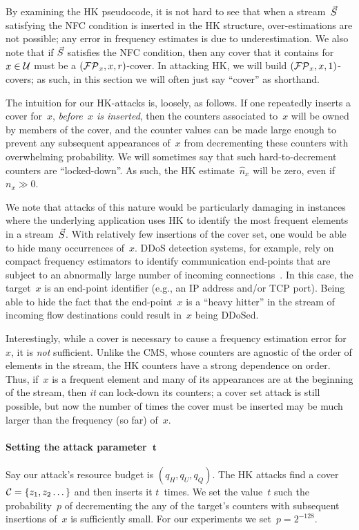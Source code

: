 By examining the HK pseudocode, it is not hard to see that when a stream~$\vec{S}$ satisfying the NFC condition is inserted in the HK structure, over-estimations are not possible; any error in frequency estimates is due to underestimation. 
%
We also note that if $\vec{S}$ satisfies the NFC condition, then any cover that it contains for $x \in \mathcal{U}$ must be a $(\mathcal{FP}_x,x,r)$-cover. In attacking HK, we will build $(\mathcal{FP}_x,x,1)$-covers; as such, in this section we will often just say ``cover'' as shorthand.  

The intuition for our HK-attacks is, loosely, as follows.  If one repeatedly inserts a cover for~$x$, \emph{before~$x$ is inserted}, then the counters associated to~$x$ will be owned by members of the cover, and the counter values can be made large enough to prevent any subsequent appearances of~$x$ from decrementing these counters with overwhelming probability.  We will sometimes say that such hard-to-decrement counters are ``locked-down''. As such, the HK estimate~$\hat{n}_x$ will be zero, even if $n_x \gg 0$. 

We note that attacks of this nature would be particularly damaging in instances where the underlying application uses HK to identify the most frequent elements in a stream~$\vec{S}$. With relatively few insertions of the cover set, one would be able to hide many occurrences of~$x$.  DDoS detection systems, for example, rely on compact frequency estimators to identify communication end-points that are subject to an abnormally large number of incoming connections~\cite{Liu_Sun_Kim_2011}. In this case, the target~$x$ is an end-point identifier (e.g., an IP address and/or TCP port). Being able to hide the fact that the end-point~$x$ is a ``heavy hitter'' in the stream of incoming flow destinations could result in~$x$ being DDoSed. 

Interestingly, while a cover is necessary to cause a frequency estimation error for~$x$, it is \emph{not} sufficient.  Unlike the CMS, whose counters are agnostic of the order of elements in the stream, the HK counters have a strong dependence on order.  Thus, if~$x$ is a frequent element and many of its appearances are at the beginning of the stream, then \emph{it} can lock-down its counters; a cover set attack is still possible, but now the number of times the cover must be inserted may be much larger than the frequency (so far) of~$x$.  

\paragraph{Setting the attack parameter~$\mathbf{t}$} Say our attack's resource budget is $(q_H,q_U,q_Q)$. The HK attacks find a cover $\mathcal{C} = \{z_1, z_2\dots\}$ and then inserts it $t$~times. We set the value~$t$ such the probability~$p$ of decrementing the any of the target's counters with subsequent insertions of~$x$ is sufficiently small. For our experiments we set~$p = 2^{-128}$.
 
